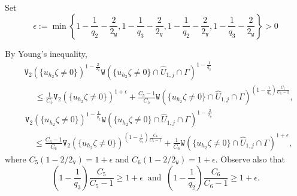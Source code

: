 \documentclass[reqno, 11pt, a4paper]{amsart}
\numberwithin{equation}{section}
\newcommand{\xv}{2_{\mathtt{V}}}
\newcommand{\xw}{2_{\mathtt{W}}}
\newcommand{\wghtv}{\mathtt{V}}
\newcommand{\wghtw}{\mathtt{W}}
\begin{document}
Set
$$
\epsilon  := \min \left\{ 1-\frac{1}{q_2} -\frac{2}{\xw} , 1-\frac{1}{q_3} -\frac{2}{\xv} , 1-\frac{1}{q_2} -\frac{2}{\xv} , 1-\frac{1}{q_3} -\frac{2}{\xw}  \right\}>0
$$


 By Young's inequality,
\begin{equation}\label{a206}
\begin{aligned}
& \wghtv _2 (\{u_{h_{2}}  \zeta \neq 0\} )^{1-\frac{2}{\xv}}  \wghtw (\{ u_{h_{2}}  \zeta \neq 0\}  \cap \hat U _{1,j} \cap \Gamma ) ^{1 -\frac{1}{q_3}}\\[3pt] 
& \quad \ \leq  \frac{1}{C_{5 }}  \wghtv _2 ( \{u_{h_{2}}  \zeta \neq 0\} )^{1+\epsilon } +  \frac{C_{5 } -1}{C_{5 }} \wghtw ( \{ u_{h_{2}}  \zeta \neq 0\} \cap \hat U _{1,j} \cap \Gamma ) ^{\left(1-\frac{1}{q_3}\right)\frac{C_{5 }}{C_{5 }-1} }     ,
\end{aligned}
\end{equation}
\begin{equation} \label{a254}
\begin{aligned}
& \wghtv _2 ( \{u_{h_{2}}  \zeta \neq 0\} )^{1 -\frac{1}{q_2}}  \wghtw ( \{ u_{h_{2}}  \zeta \neq 0\} \cap \hat U _{1,j} \cap \Gamma )^{1- \frac{2}{\xw}}\\[3pt] 
& \quad \leq \frac{C_{6 }-1}{C_{6 }} \wghtv _2 ( \{ u_{h_{2}}  \zeta \neq 0\}  ) ^{\left(1-\frac{1}{q_2}\right)\frac{C_{6 }}{C_{6 }-1} }  + \frac{1}{C_{6 }}  \wghtw ( \{u_{h_{2}}  \zeta \neq 0\} \cap \hat U _{1,j} \cap \Gamma ) ^{1+\epsilon },
\end{aligned}
\end{equation}
where $C_{5 } (1- 2/\xv ) =1+\epsilon $ and $C_{6 }(1-2/\xw)= 1+\epsilon$. Observe also that 
$$
\left(1-\frac{1}{q_3}\right)\frac{C_{5 }}{C_{5 }-1} \geq 1+\epsilon  \ \text { and  } \ \left(1-\frac{1}{q_2}\right)\frac{C_{6 }}{C_{6 }-1}\geq 1+\epsilon .
$$
\end{document}
